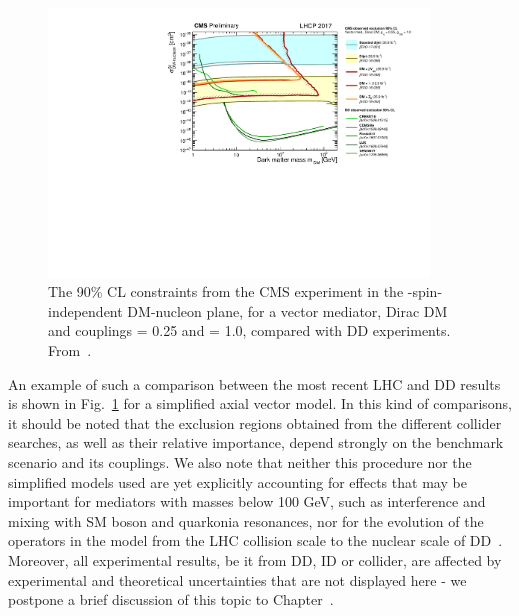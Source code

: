 \begin{figure}[!htpb]
\includegraphics[width=0.9\textwidth]{figures/SI_CMSDD_Summary}
\caption{The 90\% CL constraints from the CMS experiment in the \mdm-spin-independent DM-nucleon plane, for a vector mediator, Dirac DM and couplings \gq = 0.25 and \gdm = 1.0, compared with DD experiments. From~\cite{CMSSummary}.}
\label{fig:SICMS}
\end{figure}

An example of such a comparison between the most recent LHC and DD results is shown in Fig.~\ref{fig:SICMS} for a simplified axial vector model. In this kind of comparisons, it should be noted that the exclusion regions obtained from the different collider searches, as well as their relative importance, depend strongly on the benchmark scenario and its couplings. We also note that neither this procedure nor the simplified models used are yet explicitly accounting for effects that may be important for mediators with masses below 100 GeV, such as interference and mixing with SM boson and quarkonia resonances, nor for the evolution of the operators in the model from the LHC collision scale to the nuclear scale of DD~\cite{DEramo:2014nmf}.
Moreover, all experimental results, be it from DD, ID or collider, are affected by experimental and theoretical uncertainties that are not displayed here - we postpone a brief discussion of this topic to Chapter~\cite{sec:05_Future}.

